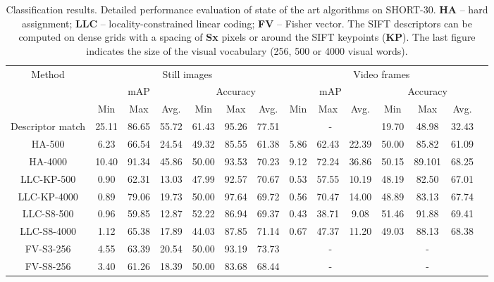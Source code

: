 \begin{table}
\centering
\begin{adjustbox}{max width=1.2\textwidth,center}
\begin{tabular}{cccccccccccccc}
   \toprule
\multirow{3}{*}{Method} & \multicolumn{6}{c}{Still images} & \multicolumn{6}{c}{Video frames}\\
\cline{2-13} 
 &  \multicolumn{3}{c}{mAP} & \multicolumn{3}{c}{Accuracy} & \multicolumn{3}{c}{mAP} & \multicolumn{3}{c}{ Accuracy}\\
& Min & Max & Avg. & Min & Max & Avg. & Min & Max & Avg. & Min & Max & Avg.\\
\hline \hline 
Descriptor match & 25.11 & 86.65 & 55.72 & 61.43 & 95.26 & 77.51 & \multicolumn{3}{c}{-} & 19.70 & 48.98 & 32.43\\
\hline
HA-500 & 6.23 & 66.54 & 24.54 & 49.32 & 85.55 & 61.38 & 5.86 & 62.43 & 22.39 &50.00 & 85.82 & 61.09\\
\hline
HA-4000 & 10.40 & 91.34 & 45.86 & 50.00 & 93.53 & 70.23 & 9.12 & 72.24 & 36.86 & 50.15 & 89.101 & 68.25 \\
\hline
LLC-KP-500 & 0.90 & 62.31 & 13.03 & 47.99 & 92.57 & 70.67  & 0.53 & 57.55 & 10.19 & 48.19 & 82.50 & 67.01\\
\hline
LLC-KP-4000 & 0.89 & 79.06 & 19.73 & 50.00 & 97.64 & 69.72 & 0.56 & 70.47 & 14.00 & 48.89 & 83.13 & 67.74 \\
\hline
LLC-S8-500 & 0.96 & 59.85 & 12.87 & 52.22 & 86.94 & 69.37 & 0.43 & 38.71 & 9.08 & 51.46 & 91.88 & 69.41\\
\hline
LLC-S8-4000 & 1.12 & 65.38 & 17.89 & 44.03 & 87.85 & 71.14 & 0.67 & 47.37 & 11.20 & 49.03 & 88.13 & 68.38\\
\hline
FV-S3-256 & 4.55 & 63.39 & 20.54 & 50.00 & 93.19 & 73.73 & \multicolumn{3}{c}{-} & \multicolumn{3}{c}{-}\\
\hline
FV-S8-256 & 3.40 & 61.26 &  18.39 & 50.00 & 83.68 & 68.44  & \multicolumn{3}{c}{-} & \multicolumn{3}{c}{-}\\
	\bottomrule
\end{tabular}
\end{adjustbox}
\caption{Classification results. Detailed performance evaluation of state of the art algorithms on SHORT-30. \textbf{HA} -- hard assignment; \textbf{LLC} -- locality-constrained linear coding; \textbf{FV} -- Fisher vector. The SIFT descriptors can be computed on dense grids with a spacing of \textbf{Sx} pixels or around the SIFT keypoints (\textbf{KP}). The last figure indicates the size of the visual vocabulary (256, 500 or 4000 visual words).}
\label{table:classification_results}
\end{table}


